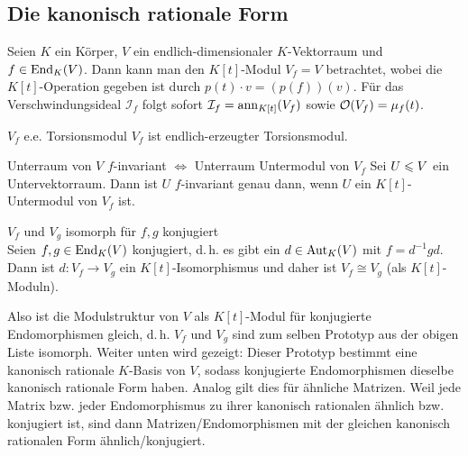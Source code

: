 \subsection{%
    Die kanonisch rationale Form%
}

\begin{Bem}
    Seien $K$ ein Körper, $V$ ein endlich-dimensionaler $K$-Vektorraum und
    $f \in \operatorname{End}_K(V)$.
    Dann kann man den $K[t]$-Modul $V_f = V$ betrachtet, wobei die
    $K[t]$-Operation gegeben ist durch $p(t) \cdot v = (p(f))(v)$.
    Für das Verschwindungsideal $\mathcal{I}_f$ folgt sofort
    $\mathcal{I}_f = \operatorname{ann}_{K[t]}(V_f)$ sowie $\mathcal{O}(V_f) = \mu_f(t)$.
\end{Bem}

\begin{Lemma}{$V_f$ e.e. Torsionsmodul}
    $V_f$ ist endlich-erzeugter Torsionsmodul.
\end{Lemma}

\begin{Lemma}{Unterraum von $V$ $f$-invariant $\Leftrightarrow$
              Unterraum Untermodul von $V_f$}
    Sei $U \leqslant V$ ein Untervektorraum.
    Dann ist $U$ $f$-invariant genau dann, wenn $U$ ein $K[t]$-Untermodul
    von $V_f$ ist.
\end{Lemma}

\begin{Satz}{$V_f$ und $V_g$ isomorph für $f, g$ konjugiert} \\
    Seien $f, g \in \operatorname{End}_K(V)$ konjugiert, d.\,h. es gibt ein
    $d \in \operatorname{Aut}_K(V)$ mit $f = d^{-1} g d$. \\
    Dann ist $d: V_f \rightarrow V_g$ ein $K[t]$-Isomorphismus und daher ist
    $V_f \cong V_g$ (als $K[t]$-Moduln).
\end{Satz}

\begin{Bem}
    Also ist die Modulstruktur von $V$ als $K[t]$-Modul für konjugierte
    Endomorphismen gleich, d.\,h. $V_f$ und $V_g$ sind zum selben Prototyp
    aus der obigen Liste isomorph.
    Weiter unten wird gezeigt:
    Dieser Prototyp bestimmt eine kanonisch rationale
    $K$-Basis von $V$, sodass konjugierte Endomorphismen dieselbe
    kanonisch rationale Form haben.
    Analog gilt dies für ähnliche Matrizen.
    Weil jede Matrix bzw. jeder Endomorphismus zu ihrer kanonisch rationalen
    ähnlich bzw. konjugiert ist, sind dann Matrizen/Endomorphismen mit der
    gleichen kanonisch rationalen Form ähnlich/konjugiert.
\end{Bem}

